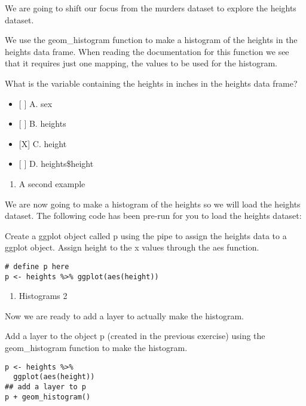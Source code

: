 \documentclass[]{article}
\providecommand{\tightlist}{%
  \setlength{\itemsep}{0pt}\setlength{\parskip}{0pt}}
\begin{document}
We are going to shift our focus from the murders dataset to explore the
heights dataset.

We use the geom\_histogram function to make a histogram of the heights
in the heights data frame. When reading the documentation for this
function we see that it requires just one mapping, the values to be used
for the histogram.

What is the variable containing the heights in inches in the heights
data frame?

\begin{itemize}
\tightlist
\item
  {[} {]} A. sex
\item
  {[} {]} B. heights
\item
  {[}X{]} C. height
\item
  {[} {]} D. heights\$height
\end{itemize}

\begin{enumerate}
\def\labelenumi{\arabic{enumi}.}
\setcounter{enumi}{15}
\tightlist
\item
  A second example
\end{enumerate}

We are now going to make a histogram of the heights so we will load the
heights dataset. The following code has been pre-run for you to load the
heights dataset:

Create a ggplot object called p using the pipe to assign the heights
data to a ggplot object. Assign height to the x values through the aes
function.

\begin{verbatim}
# define p here
p <- heights %>% ggplot(aes(height))
\end{verbatim}

\begin{enumerate}
\def\labelenumi{\arabic{enumi}.}
\setcounter{enumi}{16}
\tightlist
\item
  Histograms 2
\end{enumerate}

Now we are ready to add a layer to actually make the histogram.

Add a layer to the object p (created in the previous exercise) using the
geom\_histogram function to make the histogram.

\begin{verbatim}
p <- heights %>% 
  ggplot(aes(height))
## add a layer to p
p + geom_histogram()
\end{verbatim}
\end{document}
